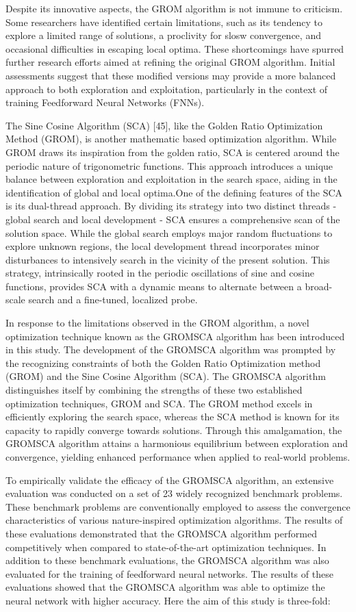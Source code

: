 Despite its innovative aspects, the GROM algorithm is not immune to criticism. Some researchers have identified certain limitations, such as its tendency to explore a limited range of solutions, a proclivity for slosw convergence, and occasional difficulties in escaping local optima. These shortcomings have spurred further research efforts aimed at refining the original GROM algorithm. Initial assessments suggest that these modified versions may provide a more balanced approach to both exploration and exploitation, particularly in the context of training Feedforward Neural Networks (FNNs).

The Sine Cosine Algorithm (SCA) [45], like the Golden Ratio Optimization Method (GROM), is another mathematic based optimization algorithm. While GROM draws its inspiration from the golden ratio, SCA is centered around the periodic nature of trigonometric functions. This approach introduces a unique balance between exploration and exploitation in the search space, aiding in the identification of global and local optima.One of the defining features of the SCA is its dual-thread approach. By dividing its strategy into two distinct threads - global search and local development - SCA ensures a comprehensive scan of the solution space. While the global search employs major random fluctuations to explore unknown regions, the local development thread incorporates minor disturbances to intensively search in the vicinity of the present solution. This strategy, intrinsically rooted in the periodic oscillations of sine and cosine functions, provides SCA with a dynamic means to alternate between a broad-scale search and a fine-tuned, localized probe.

In response to the limitations observed in the GROM algorithm, a novel optimization technique known as the GROMSCA algorithm has been introduced in this study. The development of the GROMSCA algorithm was prompted by the recognizing constraints of both the Golden Ratio Optimization method (GROM) and the Sine Cosine Algorithm (SCA). The GROMSCA algorithm distinguishes itself by combining the strengths of these two established optimization techniques, GROM and SCA. The GROM method excels in efficiently exploring the search space, whereas the SCA method is known for its capacity to rapidly converge towards solutions. Through this amalgamation, the GROMSCA algorithm attains a harmonious equilibrium between exploration and convergence, yielding enhanced performance when applied to real-world problems.

To empirically validate the efficacy of the GROMSCA algorithm, an extensive evaluation was conducted on a set of 23 widely recognized benchmark problems. These benchmark problems are conventionally employed to assess the convergence characteristics of various nature-inspired optimization algorithms. The results of these evaluations demonstrated that the GROMSCA algorithm performed competitively when compared to state-of-the-art optimization techniques. In addition to these benchmark evaluations, the GROMSCA algorithm was also evaluated for the training of feedforward neural networks. The results of these evaluations showed that the GROMSCA algorithm was able to optimize the neural network with higher accuracy. Here the aim of this study is three-fold:

